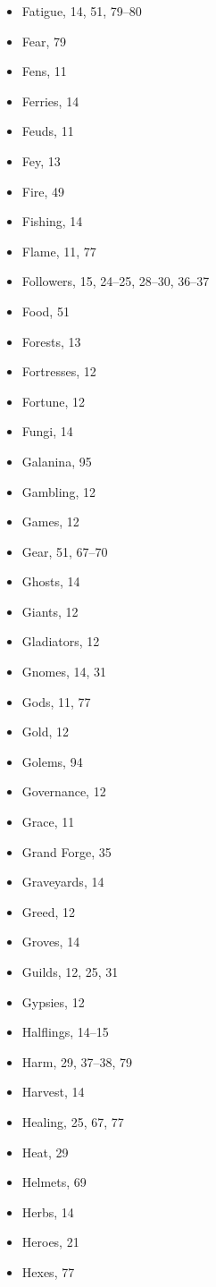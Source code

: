 \begin{multicols}{2}
\begin{itemize}
  \item Fatigue, 14, 51, 79--80
  \item Fear, 79
  \item Fens, 11
  \item Ferries, 14
  \item Feuds, 11
  \item Fey, 13
  \item Fire, 49
  \item Fishing, 14
  \item Flame, 11, 77
  \item Followers, 15, 24--25, 28--30, 36--37
  \item Food, 51
  \item Forests, 13
  \item Fortresses, 12
  \item Fortune, 12
  \item Fungi, 14
  \item Galanina, 95
  \item Gambling, 12
  \item Games, 12
  \item Gear, 51, 67--70
  \item Ghosts, 14
  \item Giants, 12
  \item Gladiators, 12
  \item Gnomes, 14, 31
  \item Gods, 11, 77
  \item Gold, 12
  \item Golems, 94
  \item Governance, 12
  \item Grace, 11
  \item Grand Forge, 35
  \item Graveyards, 14
  \item Greed, 12
  \item Groves, 14
  \item Guilds, 12, 25, 31
  \item Gypsies, 12
  \item Halflings, 14--15
  \item Harm, 29, 37--38, 79
  \item Harvest, 14
  \item Healing, 25, 67, 77
  \item Heat, 29
  \item Helmets, 69
  \item Herbs, 14
  \item Heroes, 21
  \item Hexes, 77

\end{itemize}
\end{multicols}
